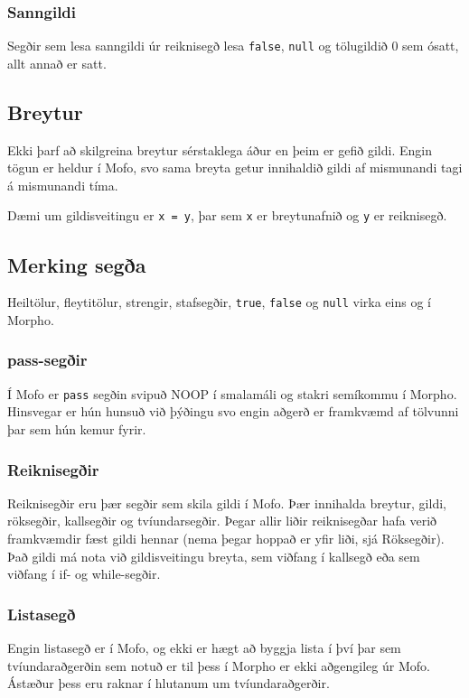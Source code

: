 \documentclass[12pt,a4paper]{article}
\begin{document}
\subsubsection{Sanngildi}
Segðir sem lesa sanngildi úr reiknisegð lesa {\tt false}, {\tt null} og tölugildið 0 sem ósatt, allt annað er satt.

\subsection{Breytur}
Ekki þarf að skilgreina breytur sérstaklega áður en þeim er gefið gildi. Engin tögun er heldur í Mofo, svo sama breyta getur innihaldið gildi af
mismunandi tagi á mismunandi tíma.

Dæmi um gildisveitingu er {\tt x = y}, þar sem {\tt x} er breytunafnið og {\tt y} er reiknisegð.

\subsection{Merking segða}
Heiltölur, fleytitölur, strengir, stafsegðir, {\tt true}, {\tt false} og {\tt null} virka eins og í Morpho.

\subsubsection{pass-segðir}
Í Mofo er {\tt pass} segðin svipuð NOOP í smalamáli og stakri semíkommu í Morpho. Hinsvegar er hún hunsuð við þýðingu svo engin aðgerð er framkvæmd af tölvunni
þar sem hún kemur fyrir.

\subsubsection{Reiknisegðir}
Reiknisegðir eru þær segðir sem skila gildi í Mofo. Þær innihalda breytur, gildi, röksegðir, kallsegðir og tvíundarsegðir. Þegar allir liðir reiknisegðar
hafa verið framkvæmdir fæst gildi hennar (nema þegar hoppað er yfir liði, sjá Röksegðir). Það gildi má nota við gildisveitingu breyta, sem viðfang í kallsegð
eða sem viðfang í if- og while-segðir.

\subsubsection{Listasegð}
Engin listasegð er í Mofo, og ekki er hægt að byggja lista í því þar sem tvíundaraðgerðin sem notuð er til þess í Morpho er ekki aðgengileg úr Mofo.
Ástæður þess eru raknar í hlutanum um tvíundaraðgerðir.
\end{document}
